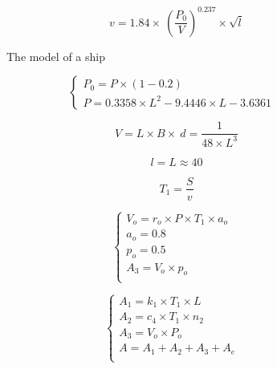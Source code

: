 \documentclass{mcmthesis}
\begin{document}
\begin{equation}\label{1}
v=1.84\times \ (\frac{P_0}{V}) ^{0.237} \times \sqrt{l}
\end{equation}

\begin{figure}[tbp]
  \caption{The model of a ship}\label{figure1}
\end{figure}

\begin{equation}
\left\{
\begin{array}{lr}
P_0=P \times (1-0.2) &\\
P= 0.3358\times L^2 -9.4446\times L - 3.6361

\end{array}
\right.
\end{equation}



\begin{equation}\label{3}
V=L\times B\times\ d =\frac{1}{48\times L^3}
\end{equation}

\begin{equation}\label{4}
l=L\approx 40
\end{equation}

\begin{equation}\label{4}
T_1=\frac{S}{v}
\end{equation}

\begin{equation}
\left\{
\begin{array}{lr}
V_o=r_o \times P \times T_1 \times a_o &\\
a_o=0.8&\\
p_o=0.5&\\
A_3=V_o  \times p_o\\
\end{array}
\right.
\end{equation}



			\begin{equation}
			\left\{
			\begin{array}{lr}

A_1=k_1 \times T_1\times L  &\\
A_2=c_4  \times T_1 \times n_2 &\\
A_3=V_o  \times P_o &\\
A=A_1+A_2+A_3+A_e \\		
			\end{array}
			\right.
			\end{equation}
\end{document}

